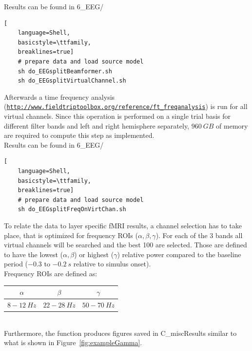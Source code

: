 \documentclass[12pt,a4paper]{scrartcl}
\begin{document}
\noindent Results can be found in 6\_EEG/\\
\begin{lstlisting}[
    language=Shell,
    basicstyle=\ttfamily,
    breaklines=true]
    # prepare data and load source model
    sh do_EEGsplitBeamformer.sh
    sh do_EEGsplitVirtualChannel.sh
\end{lstlisting}
Afterwards a time frequency analysis (\href{http://www.fieldtriptoolbox.org/reference/ft\_freqanalysis}{\nolinkurl{http://www.fieldtriptoolbox.org/reference/ft\_freqanalysis}}) is run for all virtual channels. Since this operation is performed on a single trial basis for different filter bands and left and right hemisphere separately, $960~GB$ of memory are required to compute this step as implemented.\\

\noindent Results can be found in 6\_EEG/\\
\begin{lstlisting}[
    language=Shell,
    basicstyle=\ttfamily,
    breaklines=true]
    # prepare data and load source model
    sh do_EEGsplitFreqOnVirtChan.sh
\end{lstlisting}
To relate the data to layer specific fMRI results, a channel selection has to take place, that is optimized for frequency ROIs ($\alpha, \beta, \gamma$). For each of the 3 bands all virtual channels will be searched and the best 100 are selected. Those are defined to have the lowest ($\alpha, \beta$) or highest ($\gamma$) relative power compared to the baseline period ($-0.3$ to $-0.2~s$ relative to simulus onset).\\

\noindent Frequency ROIs are defined as:
\begin{table}[h]
\begin{tabular}{c | c | c}
\toprule
$\alpha$ & $\beta$ & $\gamma$\\\toprule
$8-12~Hz$ & $22-28~Hz$ & $50-70~Hz$ \\\bottomrule
\end{tabular}
\end{table}\\
Furthermore, the function produces figures saved in C\_miscResults similar to what is shown in Figure~\ref{fig:exampleGamma}.\\
\end{document}
